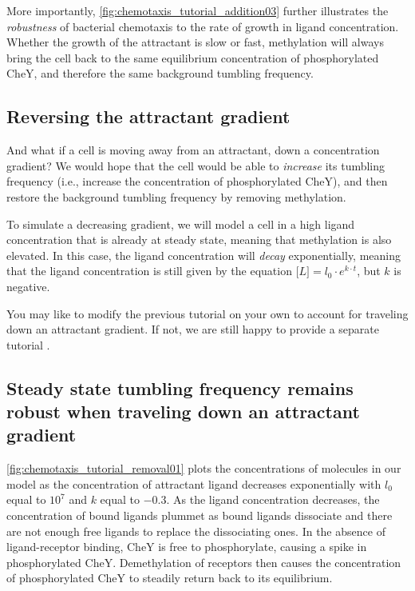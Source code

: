 More importantly, \autoref{fig:chemotaxis_tutorial_addition03} further illustrates the \textit{robustness} of bacterial chemotaxis to the rate of growth in ligand concentration. Whether the growth of the attractant is slow or fast, methylation will always bring the cell back to the same equilibrium concentration of phosphorylated CheY, and therefore the same background tumbling frequency.

\FloatBarrier
{}
\subsection{Reversing the attractant gradient}

And what if a cell is moving away from an attractant, down a concentration gradient? We would hope that the cell would be able to \textit{increase} its tumbling frequency (i.e., increase the concentration of phosphorylated CheY), and then restore the background tumbling frequency by removing methylation.

To simulate a decreasing gradient, we will model a cell in a high ligand concentration that is already at steady state, meaning that methylation is also elevated. In this case, the ligand concentration will \textit{decay} exponentially, meaning that the ligand concentration is still given by the equation $\text{[}L{]} = l_0 \cdot e^{k \cdot t}$, but $k$ is negative.\\

\begin{qbox}\end{qbox}

You may like to modify the previous tutorial on your own to account for traveling down an attractant gradient. If not, we are still happy to provide a separate tutorial .


\FloatBarrier
{}
\subsection{Steady state tumbling frequency remains robust when traveling down an attractant gradient}

\autoref{fig:chemotaxis_tutorial_removal01} plots the concentrations of molecules in our model as the concentration of attractant ligand decreases exponentially with $l_0$ equal to $10^7$ and $k$ equal to $-0.3$. As the ligand concentration decreases, the concentration of bound ligands plummet as bound ligands dissociate and there are not enough free ligands to replace the dissociating ones. In the absence of ligand-receptor binding, CheY is free to phosphorylate, causing a spike in phosphorylated CheY. Demethylation of receptors then causes the concentration of phosphorylated CheY to steadily return back to its equilibrium.\\

